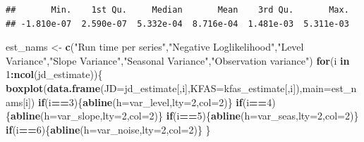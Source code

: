 \documentclass[]{article}
\newenvironment{Shaded}{\begin{snugshade}}{\end{snugshade}}
\newcommand{\KeywordTok}[1]{\textcolor[rgb]{0.13,0.29,0.53}{\textbf{#1}}}
\newcommand{\DataTypeTok}[1]{\textcolor[rgb]{0.13,0.29,0.53}{#1}}
\newcommand{\DecValTok}[1]{\textcolor[rgb]{0.00,0.00,0.81}{#1}}
\newcommand{\StringTok}[1]{\textcolor[rgb]{0.31,0.60,0.02}{#1}}
\newcommand{\ControlFlowTok}[1]{\textcolor[rgb]{0.13,0.29,0.53}{\textbf{#1}}}
\newcommand{\OperatorTok}[1]{\textcolor[rgb]{0.81,0.36,0.00}{\textbf{#1}}}
\newcommand{\NormalTok}[1]{#1}
\begin{document}
\begin{verbatim}
##       Min.    1st Qu.     Median       Mean    3rd Qu.       Max. 
## -1.810e-07  2.590e-07  5.332e-04  8.716e-04  1.481e-03  5.311e-03
\end{verbatim}

\begin{Shaded}
\begin{Highlighting}[]
\NormalTok{est_nams <-}\StringTok{ }\KeywordTok{c}\NormalTok{(}\StringTok{"Run time per series"}\NormalTok{,}\StringTok{"Negative Loglikelihood"}\NormalTok{,}\StringTok{"Level Variance"}\NormalTok{,}\StringTok{"Slope Variance"}\NormalTok{,}\StringTok{"Seasonal Variance"}\NormalTok{,}\StringTok{"Observation variance"}\NormalTok{)}
\ControlFlowTok{for}\NormalTok{(i }\ControlFlowTok{in} \DecValTok{1}\OperatorTok{:}\KeywordTok{ncol}\NormalTok{(jd_estimate))\{}
  \KeywordTok{boxplot}\NormalTok{(}\KeywordTok{data.frame}\NormalTok{(}\DataTypeTok{JD=}\NormalTok{jd_estimate[,i],}\DataTypeTok{KFAS=}\NormalTok{kfas_estimate[,i]),}\DataTypeTok{main=}\NormalTok{est_nams[i])}
  \ControlFlowTok{if}\NormalTok{(i}\OperatorTok{==}\DecValTok{3}\NormalTok{)\{}\KeywordTok{abline}\NormalTok{(}\DataTypeTok{h=}\NormalTok{var_level,}\DataTypeTok{lty=}\DecValTok{2}\NormalTok{,}\DataTypeTok{col=}\DecValTok{2}\NormalTok{)\}}
  \ControlFlowTok{if}\NormalTok{(i}\OperatorTok{==}\DecValTok{4}\NormalTok{)\{}\KeywordTok{abline}\NormalTok{(}\DataTypeTok{h=}\NormalTok{var_slope,}\DataTypeTok{lty=}\DecValTok{2}\NormalTok{,}\DataTypeTok{col=}\DecValTok{2}\NormalTok{)\}}
  \ControlFlowTok{if}\NormalTok{(i}\OperatorTok{==}\DecValTok{5}\NormalTok{)\{}\KeywordTok{abline}\NormalTok{(}\DataTypeTok{h=}\NormalTok{var_seas,}\DataTypeTok{lty=}\DecValTok{2}\NormalTok{,}\DataTypeTok{col=}\DecValTok{2}\NormalTok{)\}}
  \ControlFlowTok{if}\NormalTok{(i}\OperatorTok{==}\DecValTok{6}\NormalTok{)\{}\KeywordTok{abline}\NormalTok{(}\DataTypeTok{h=}\NormalTok{var_noise,}\DataTypeTok{lty=}\DecValTok{2}\NormalTok{,}\DataTypeTok{col=}\DecValTok{2}\NormalTok{)\}}
\NormalTok{\}}
\end{Highlighting}
\end{Shaded}
\end{document}
